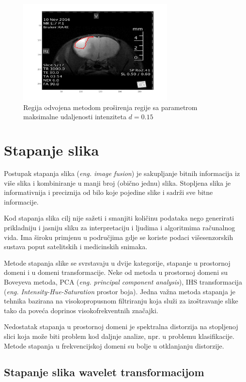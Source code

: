\documentclass[lmodern, utf8, seminar]{fer}
\begin{document}
\begin{figure}[H]
	\centering
	\includegraphics[width=0.7\textwidth]{regiongrow}
	\caption{Regija odvojena metodom proširenja regije sa parametrom maksimalne udaljenosti intenziteta $d = 0.15$}
	\label{fig:regiongrow}
\end{figure}

\chapter{Stapanje slika}

Postupak stapanja slika ({\it eng. image fusion}) je sakupljanje bitnih informacija iz više slika i kombiniranje u manji broj (obično jednu) slika. Stopljena slika je informativnija i preciznija od bilo koje pojedine slike i sadrži sve bitne informacije.

Kod stapanja slika cilj nije sažeti i smanjiti količinu podataka nego generirati prikladniju i jasniju sliku za interpretaciju i ljudima i algoritmima računalnog vida.
Ima široku primjenu u područjima gdje se koriste podaci višesenzorskih sustava poput satelitskih i medicinskih snimaka.

Metode stapanja slike se svrstavaju u dvije kategorije, stapanje u prostornoj domeni i u domeni transformacije. Neke od metoda u prostornoj domeni su Boveyeva metoda, PCA ({\it eng. principal component analysis}), IHS transformacija ({\it eng. Intensity-Hue-Saturation} prostor boja). Jedna važna metoda stapanja je tehnika bazirana na visokopropusnom filtriranju koja služi za izoštravanje slike tako da poveća doprinos visokofrekventnih značajki.

Nedostatak stapanja u prostornoj domeni je spektralna distorzija na stopljenoj slici koja može biti problem kod daljnje analize, npr. u problemu klasifikacije. Metode stapanja u frekvencijskoj domeni su bolje u otklanjanju distorzije.

\section{Stapanje slika wavelet transformacijom}
\end{document}
